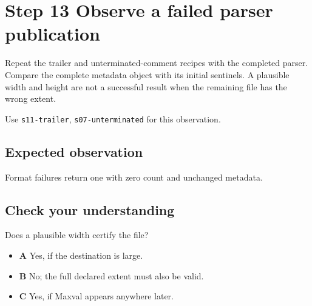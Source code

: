 \section{Step 13 Observe a failed parser publication}\label{ppm-s13}

Repeat the trailer and unterminated-comment recipes with the completed parser. Compare the complete metadata object with its initial sentinels. A plausible width and height are not a successful result when the remaining file has the wrong extent.

Use \texttt{s11-trailer}, \texttt{s07-unterminated} for this observation.

\subsection{Expected observation}
Format failures return one with zero count and unchanged metadata.

\subsection{Check your understanding}
Does a plausible width certify the file?

\begin{itemize}
\item \textbf{A} Yes, if the destination is large.
\item \textbf{B} No; the full declared extent must also be valid.
\item \textbf{C} Yes, if Maxval appears anywhere later.
\end{itemize}
